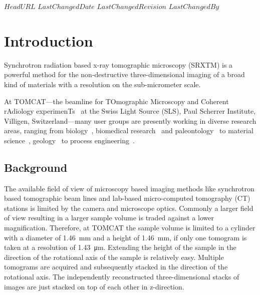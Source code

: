 \svnidlong
{$HeadURL$}
{$LastChangedDate$}
{$LastChangedRevision$}
{$LastChangedBy$}

\ifhtml
\else
\begin{center}
\end{center}
\fi

\section{Introduction}%

Synchrotron radiation based x-ray tomographic microscopy (SRXTM) is a powerful method for the non-destructive three-dimensional imaging of a broad kind of materials with a resolution on the sub-micrometer scale.

At TOMCAT---the beamline for TOmographic Microscopy and Coherent rAdiology experimenTs~\cite{Stampanoni2007} at the Swiss Light Source (SLS), Paul Scherrer Institute, Villigen, Switzerland---many user groups are presently working in diverse research areas, ranging from biology~\cite{McDonald2009,PerezHuerta2009}, biomedical research~\cite{Schittny2008,Tsuda2008,Heinzer2008} and paleontology~\cite{Gostling2008,Friis2007,Hagadorn2006,Donoghue2006} to material science~\cite{Gallucci2007}, geology~\cite{Carminati2007} to process engineering~\cite{Davenport2007,Vaucher2007}.

\subsection{Background}%
The available field of view of microscopy based imaging methods like synchrotron based tomographic beam lines and lab-based micro-computed tomography (\micro CT) stations is limited by the camera and microscope optics. Commonly a larger field of view resulting in a larger sample volume is traded against a lower magnification. Therefore, at TOMCAT the sample volume is limited to a cylinder with a diameter of \SI{1.46}{\milli\meter} and a height of \SI{1.46}{\milli\meter}, if only one tomogram is taken at a resolution of \SI{1.43}{\micro\meter}. Extending the height of the sample in the direction of the rotational axis of the sample is relatively easy. Multiple tomograms are acquired and subsequently stacked in the direction of the rotational axis. The independently reconstructed three-dimensional stacks of images are just stacked on top of each other in z-direction. 

